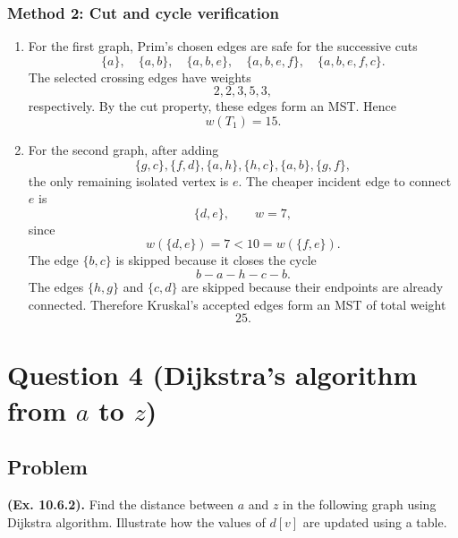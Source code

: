 \documentclass[12pt]{article}
\begin{document}
\subsubsection{Method 2: Cut and cycle verification}
\begin{enumerate}[label=(\alph*)]
  \item For the first graph, Prim's chosen edges are safe for the successive cuts
  \[
  \{a\},\quad
  \{a,b\},\quad
  \{a,b,e\},\quad
  \{a,b,e,f\},\quad
  \{a,b,e,f,c\}.
  \]
  The selected crossing edges have weights
  \[
    2,2,3,5,3,
  \]
  respectively. By the cut property, these edges form an MST. Hence
  \[
    \boxed{w(T_1)=15.}
  \]

  \item For the second graph, after adding
  \[
    \{g,c\},\{f,d\},\{a,h\},\{h,c\},\{a,b\},\{g,f\},
  \]
  the only remaining isolated vertex is $e$. The cheaper incident edge to connect $e$ is
  \[
    \{d,e\},\qquad w=7,
  \]
  since
  \[
    w(\{d,e\})=7<10=w(\{f,e\}).
  \]
  The edge $\{b,c\}$ is skipped because it closes the cycle
  \[
    b-a-h-c-b.
  \]
  The edges $\{h,g\}$ and $\{c,d\}$ are skipped because their endpoints are already connected. Therefore Kruskal's accepted edges form an MST of total weight
  \[
    \boxed{25.}
  \]
\end{enumerate}

\newpage
\section{Question 4 (Dijkstra's algorithm from $a$ to $z$)}

\subsection{Problem}
\textbf{(Ex. 10.6.2).} Find the distance between $a$ and $z$ in the following graph using Dijkstra algorithm. Illustrate how the values of $d[v]$ are updated using a table.

\begin{center}
\end{center}
\end{document}
